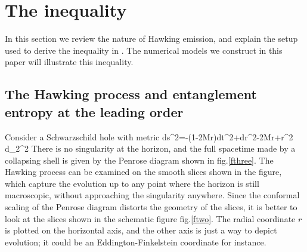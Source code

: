 \documentclass[11pt]{article}
\begin{document}
\section{The inequality}
\label{ineq}\setcounter{equation}{0}

In this section we review the nature of Hawking emission, and explain the setup used to derive the inequality in \cite{mathurfuzz}. The numerical models we construct in this paper will illustrate this inequality.

\subsection{The Hawking process and entanglement entropy at the leading order}

Consider a Schwarzschild hole with metric
\be
ds^2=-(1-{2M\over r})dt^2+{dr^2-{2M\over r}}+r^2 d\Omega_2^2
\label{qthree}
\ee
There is no singularity at the horizon, and the full spacetime made by a collapsing shell is given by the Penrose diagram shown in fig.\ref{fthree}. 
The Hawking process can be examined on the smooth slices shown in the figure, which capture the evolution up to any point where the horizon is still macroscopic,  without approaching the singularity anywhere. Since the conformal scaling of the Penrose diagram distorts the geometry of the slices, it is better to look at the slices shown in the schematic figure fig.\ref{ftwo}. The radial coordinate $r$ is plotted on the horizontal axis, and the other axis is just a way to depict evolution; it could be an Eddington-Finkelstein coordinate for instance.
\end{document}
